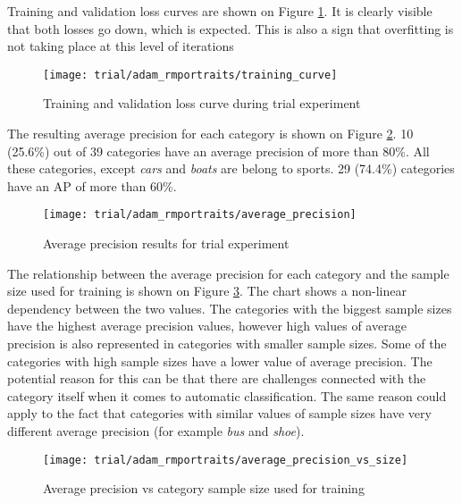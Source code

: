     Training and validation loss curves are shown on Figure \ref{fig:trial-training-curve}. It is clearly visible that both losses go down, which is expected. This is also a sign that overfitting is not taking place at this level of iterations
    
    \begin{figure}[H]
        \centering
        \texttt{[image: trial/adam\_rmportraits/training\_curve]}
        \caption{Training and validation loss curve during trial experiment}
        \label{fig:trial-training-curve}
    \end{figure}
    
    The resulting average precision for each category is shown on Figure \ref{fig:trial-average-precision}. 10 (25.6\%) out of 39 categories have an average precision of more than 80\%. All these categories, except \textit{cars} and \textit{boats} are belong to sports. 29 (74.4\%) categories have an AP of more than 60\%.

    \begin{figure}[H]
        \centering
        \texttt{[image: trial/adam\_rmportraits/average\_precision]}
        \caption{Average precision results for trial experiment}
        \label{fig:trial-average-precision}
    \end{figure}
    
    The relationship between the average precision for each category and the sample size used for training is shown on Figure \ref{fig:trial-average-precision-vs-size}. The chart shows a non-linear dependency between the two values. The categories with the biggest sample sizes have the highest average precision values, however high values of average precision is also represented in categories with smaller sample sizes. Some of the categories with high sample sizes have a lower value of average precision. The potential reason for this can be that there are challenges connected with the category itself when it comes to automatic classification. The same reason could apply to the fact that categories with similar values of sample sizes have very different average precision (for example \textit{bus} and \textit{shoe}).
    
    \begin{figure}[H]
        \centering
        \texttt{[image: trial/adam\_rmportraits/average\_precision\_vs\_size]}
        \caption{Average precision vs category sample size used for training}
        \label{fig:trial-average-precision-vs-size}
    \end{figure}
    
